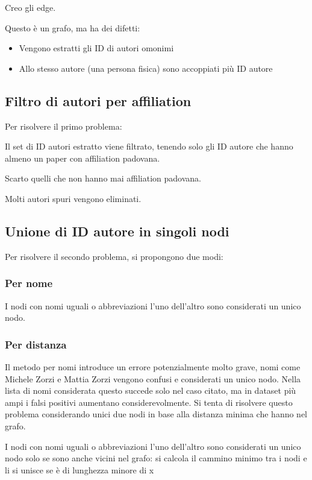 \documentclass[12pt,a4paper,twoside]{report}
\begin{document}
Creo gli edge.

Questo è un grafo, ma ha dei difetti:
\begin{itemize}[noitemsep, topsep=0pt]
\item
Vengono estratti gli ID di autori omonimi
\item
Allo stesso autore (una persona fisica) sono accoppiati più ID autore
\end{itemize}

\subsection{Filtro di autori per affiliation} \label{ssc:padovani}
Per risolvere il primo problema:

Il set di ID autori estratto viene filtrato, tenendo solo gli ID autore che hanno almeno un paper con affiliation padovana.

Scarto quelli che non hanno mai affiliation padovana.

Molti autori spuri vengono eliminati.

\subsection{Unione di ID autore in singoli nodi} \label{ssc:collassa}
Per risolvere il secondo problema, si propongono due modi:
\subsubsection{Per nome} \label{ssc:nomi}
I nodi con nomi uguali o abbreviazioni l'uno dell'altro sono considerati un unico nodo.


\subsubsection{Per distanza} \label{ssc:nomi}
Il metodo per nomi
introduce un errore potenzialmente molto grave, nomi come Michele Zorzi e Mattia Zorzi vengono confusi e considerati un unico nodo. Nella lista di nomi considerata questo succede solo nel caso citato, ma in dataset più ampi i falsi positivi aumentano considerevolmente. Si tenta di risolvere questo problema considerando unici due nodi in base alla distanza minima che hanno nel grafo.

I nodi con nomi uguali o abbreviazioni l'uno dell'altro sono considerati un unico nodo solo se sono anche vicini nel grafo: si calcola il cammino minimo tra i nodi e li si unisce se è di lunghezza minore di x
\end{document}
